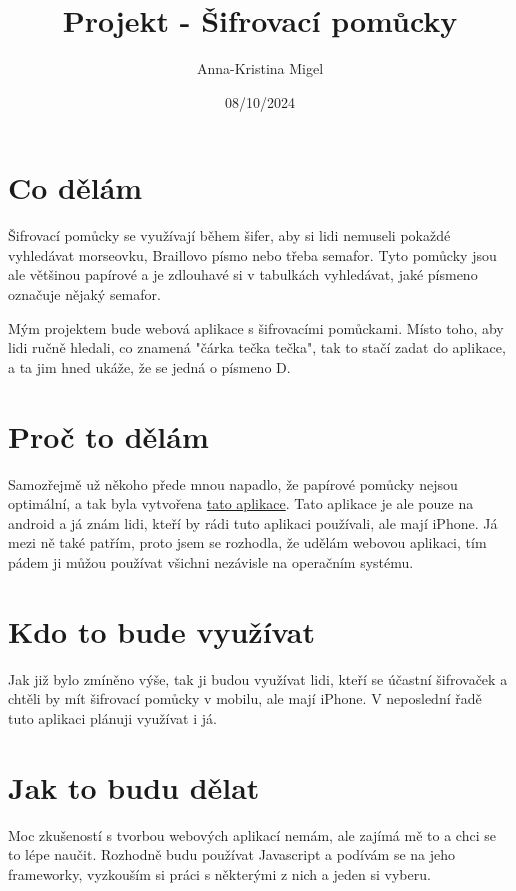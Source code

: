 \documentclass{article}
\title{Projekt - Šifrovací pomůcky}
\author{Anna-Kristina Migel}
\date{08/10/2024}
\begin{document}
\maketitle{}

\section{Co dělám}

Šifrovací pomůcky se využívají během šifer, aby si lidi nemuseli pokaždé vyhledávat morseovku, Braillovo písmo nebo třeba semafor. Tyto pomůcky jsou ale většinou papírové a je zdlouhavé si v tabulkách vyhledávat, jaké písmeno označuje nějaký semafor.

Mým projektem bude webová aplikace s šifrovacími pomůckami. Místo toho, aby lidi ručně hledali, co znamená "čárka tečka tečka", tak to stačí zadat do aplikace, a ta jim hned ukáže, že se jedná o písmeno D.

\section{Proč to dělám}

Samozřejmě už někoho přede mnou napadlo, že papírové pomůcky nejsou optimální, a tak byla vytvořena \href{https://play.google.com/store/apps/details?id=cz.absolutno.sifry&hl=cs}{tato aplikace}. Tato aplikace je ale pouze na android a já znám lidi, kteří by rádi tuto aplikaci používali, ale mají iPhone. Já mezi ně také patřím, proto jsem se rozhodla, že udělám webovou aplikaci, tím pádem ji můžou používat všichni nezávisle na operačním systému.

\section{Kdo to bude využívat}

Jak již bylo zmíněno výše, tak ji budou využívat lidi, kteří se účastní šifrovaček a chtěli by mít šifrovací pomůcky v mobilu, ale mají iPhone. V neposlední řadě tuto aplikaci plánuji využívat i já.

\section{Jak to budu dělat}

Moc zkušeností s tvorbou webových aplikací nemám, ale zajímá mě to a chci se to lépe naučit. Rozhodně budu používat Javascript a podívám se na jeho frameworky, vyzkouším si práci s některými z nich a jeden si vyberu.
\end{document}

